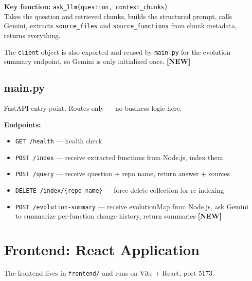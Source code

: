 \documentclass[a4paper,11pt]{article}
\begin{document}
\textbf{Key function:} \texttt{ask\_llm(question, context\_chunks)}\\[3pt]
Takes the question and retrieved chunks, builds the structured prompt, calls Gemini, extracts \texttt{source\_files} and \texttt{source\_functions} from chunk metadata, returns everything.

The \texttt{client} object is also exported and reused by \texttt{main.py} for the evolution summary endpoint, so Gemini is only initialized once. \textbf{[NEW]}

\subsection{main.py}
FastAPI entry point. Routes only --- no business logic here.

\textbf{Endpoints:}
\begin{itemize}
    \item \texttt{GET /health} --- health check
    \item \texttt{POST /index} --- receive extracted functions from Node.js, index them
    \item \texttt{POST /query} --- receive question + repo name, return answer + sources
    \item \texttt{DELETE /index/\{repo\_name\}} --- force delete collection for re-indexing
    \item \texttt{POST /evolution-summary} --- receive evolutionMap from Node.js, ask Gemini to summarize per-function change history, return summaries \textbf{[NEW]}
\end{itemize}

\newpage

\section{Frontend: React Application}

The frontend lives in \texttt{frontend/} and runs on Vite + React, port 5173.
\end{document}
